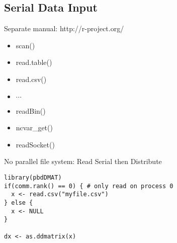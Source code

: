 \subsection{Serial Data Input}

\begin{frame}
\begin{block}{Separate manual: http://r-project.org/}
\begin{itemize}
\item scan()
\item read.table()
\item read.csv()
\item $\cdots$
\item readBin()
\item ncvar\_get()
\item readSocket()
\end{itemize}
\end{block}
\end{frame}

\begin{frame}
  \begin{exampleblock}{No parallel file system: Read Serial then Distribute}\pause
\begin{lstlisting}[title=read.csv()]
library(pbdDMAT)
if(comm.rank() == 0) { # only read on process 0
  x <- read.csv("myfile.csv")
} else {
  x <- NULL
}

dx <- as.ddmatrix(x)
\end{lstlisting}
  \end{exampleblock}
\end{frame}


